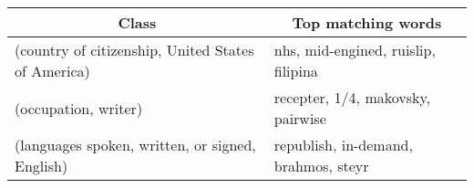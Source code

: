 \begin{tabular}{| l | l |}
    \hline

    \multicolumn{1}{|c|}{\textbf{Class}} &
    \multicolumn{1}{|c|}{\textbf{Top matching words}} \\

    \hline \hline

    (country of citizenship, United States of America) & nhs, mid-engined, ruislip, filipina   \\
    (occupation, writer)                               & recepter, 1/4, makovsky, pairwise     \\
    (languages spoken, written, or signed, English)    & republish, in-demand, brahmos, steyr \\

    \hline
\end{tabular}
